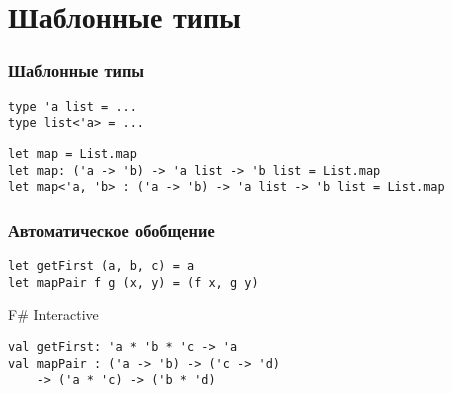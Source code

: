 \documentclass{../../slides-style}
\begin{document}
    \begin{frame}[plain]
        \titlepage
    \end{frame}

    \section{Шаблонные типы}
    
    \begin{frame}[fragile]
        \frametitle{Шаблонные типы}
        \begin{verbatim}
type 'a list = ...
type list<'a> = ...
        \end{verbatim}

        \begin{verbatim}
let map = List.map
let map: ('a -> 'b) -> 'a list -> 'b list = List.map
let map<'a, 'b> : ('a -> 'b) -> 'a list -> 'b list = List.map
        \end{verbatim}
    \end{frame}

    \begin{frame}[fragile]
        \frametitle{Автоматическое обобщение}
        \begin{verbatim}
let getFirst (a, b, c) = a
let mapPair f g (x, y) = (f x, g y)
        \end{verbatim}

        \begin{alertblock}{F\# Interactive}
            \begin{verbatim}
val getFirst: 'a * 'b * 'c -> 'a
val mapPair : ('a -> 'b) -> ('c -> 'd) 
    -> ('a * 'c) -> ('b * 'd)
            \end{verbatim}
        \end{alertblock}
    \end{frame}
\end{document}
